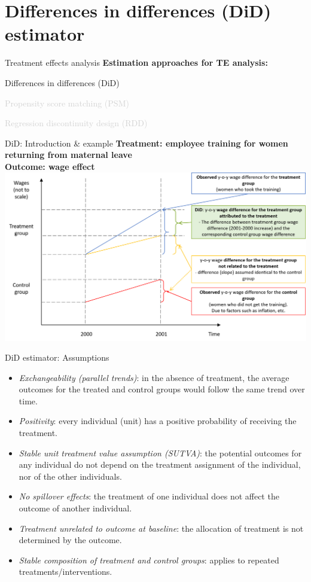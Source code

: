 \documentclass{beamer}
\begin{document}
\section{Differences in differences (DiD) estimator}
\begin{frame}{Treatment effects analysis}
\textbf{Estimation approaches for TE analysis:}\\
\bigskip
\begin{enumerate}
    \item Differences in differences (DiD)
    \bigskip
    \item \textcolor{lightgray}{Propensity score matching (PSM)
    \bigskip
    \item Regression discontinuity design (RDD)}
\end{enumerate}
\end{frame}
\begin{frame}{DiD: Introduction \& example}
\vfill
{\footnotesize \textbf{Treatment: employee training for women returning from maternal leave\\ Outcome: wage effect}} \\
\medskip
\includegraphics[width=\textwidth]{./IMG/Obrazek3}
\end{frame}
\begin{frame}{DiD estimator: Assumptions}
\begin{itemize}
    \item \emph{Exchangeability (parallel trends)}: in the absence of treatment, the average outcomes for the treated and control groups would follow the same trend over time.
    \item \emph{Positivity}: every individual (unit) has a positive probability of receiving the treatment.
    \item \emph{Stable unit treatment value assumption (SUTVA)}: the potential outcomes for any individual do not depend on the treatment assignment of the individual, nor of the other individuals.
    \item \emph{No spillover effects}: the treatment of one individual does not affect the outcome of another individual.
    \item \emph{Treatment unrelated to outcome at baseline}: the allocation of treatment is not determined by the outcome. 
    \item \emph{Stable composition of treatment and control groups}: applies to repeated treatments/interventions.
\end{itemize}
\end{frame}
\end{document}
